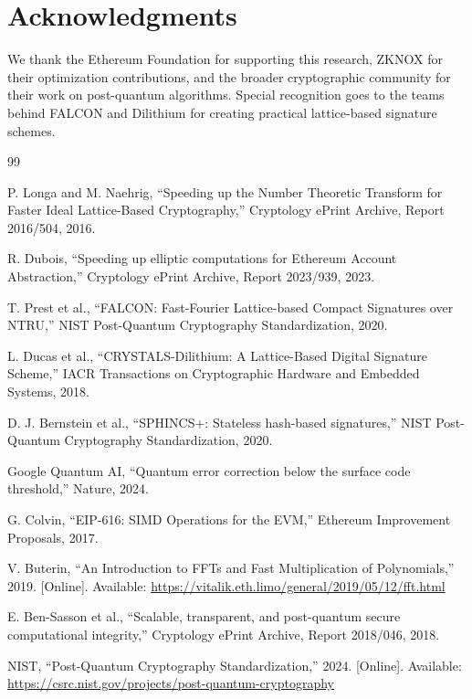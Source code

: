 \section*{Acknowledgments}


We thank the Ethereum Foundation for supporting this research, ZKNOX for their optimization contributions, and the broader cryptographic community for their work on post-quantum algorithms. Special recognition goes to the teams behind FALCON and Dilithium for creating practical lattice-based signature schemes.

\begin{thebibliography}{99}

P. Longa and M. Naehrig, ``Speeding up the Number Theoretic Transform for Faster Ideal Lattice-Based Cryptography,'' Cryptology ePrint Archive, Report 2016/504, 2016.

R. Dubois, ``Speeding up elliptic computations for Ethereum Account Abstraction,'' Cryptology ePrint Archive, Report 2023/939, 2023.

T. Prest et al., ``FALCON: Fast-Fourier Lattice-based Compact Signatures over NTRU,'' NIST Post-Quantum Cryptography Standardization, 2020.

L. Ducas et al., ``CRYSTALS-Dilithium: A Lattice-Based Digital Signature Scheme,'' IACR Transactions on Cryptographic Hardware and Embedded Systems, 2018.

D. J. Bernstein et al., ``SPHINCS+: Stateless hash-based signatures,'' NIST Post-Quantum Cryptography Standardization, 2020.

Google Quantum AI, ``Quantum error correction below the surface code threshold,'' Nature, 2024.

G. Colvin, ``EIP-616: SIMD Operations for the EVM,'' Ethereum Improvement Proposals, 2017.

V. Buterin, ``An Introduction to FFTs and Fast Multiplication of Polynomials,'' 2019. [Online]. Available: \url{https://vitalik.eth.limo/general/2019/05/12/fft.html}

E. Ben-Sasson et al., ``Scalable, transparent, and post-quantum secure computational integrity,'' Cryptology ePrint Archive, Report 2018/046, 2018.

NIST, ``Post-Quantum Cryptography Standardization,'' 2024. [Online]. Available: \url{https://csrc.nist.gov/projects/post-quantum-cryptography}

\end{thebibliography}

